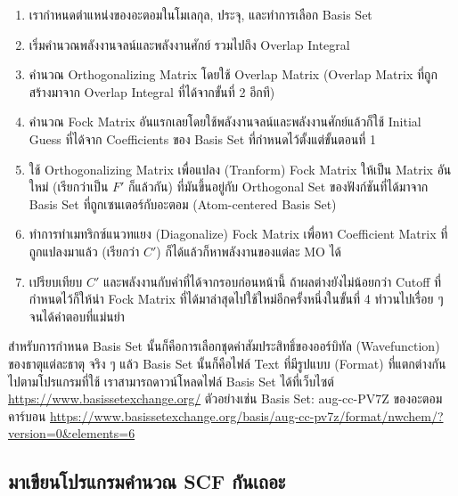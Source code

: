 \begin{enumerate}[topsep=0pt,noitemsep]
  \setlength\itemsep{1em}
  \item เรากำหนดตำแหน่งของอะตอมในโมเลกุล, ประจุ, และทำการเลือก Basis Set

  \item เริ่มคำนวณพลังงานจลน์และพลังงานศักย์ รวมไปถึง Overlap Integral

  \item คำนวณ Orthogonalizing Matrix โดยใช้ Overlap Matrix (Overlap Matrix ที่ถูกสร้างมาจาก Overlap Integral
        ที่ได้จากขั้นที่ 2 อีกที)

  \item คำนวณ Fock Matrix อันแรกเลยโดยใช้พลังงานจลน์และพลังงานศักย์แล้วก็ใช้ Initial Guess ที่ได้จาก Coefficients
        ของ Basis Set ที่กำหนดไว้ตั้งแต่ขั้นตอนที่ 1

  \item ใช้ Orthogonalizing Matrix เพื่อแปลง (Tranform) Fock Matrix ให้เป็น Matrix อันใหม่ (เรียกว่าเป็น $F'$ ก็แล้วกัน)
        ที่มันขึ้นอยู่กับ Orthogonal Set ของฟังก์ชันที่ได้มาจาก Basis Set ที่ถูกเซนเตอร์กับอะตอม (Atom-centered Basis Set)

  \item ทำการทำเมทริกซ์แนวทแยง (Diagonalize) Fock Matrix เพื่อหา Coefficient Matrix ที่ถูกแปลงมาแล้ว (เรียกว่า $C'$)
        ก็ได้แล้วก็หาพลังงานของแต่ละ MO ได้

  \item เปรียบเทียบ $C'$ และพลังงานกับค่าที่ได้จากรอบก่อนหน้านี้ ถ้าผลต่างยังไม่น้อยกว่า Cutoff ที่กำหนดไว้ก็ให้นำ Fock Matrix
        ที่ได้มาล่าสุดไปใช้ใหม่อีกครั้งหนึ่งในขั้นที่ 4 ทำวนไปเรื่อย ๆ จนได้คำตอบที่แม่นยำ
\end{enumerate}

สำหรับการกำหนด Basis Set นั้นก็คือการเลือกชุดค่าสัมประสิทธิ์ของออร์บิทัล (Wavefunction) ของธาตุแต่ละธาตุ จริง ๆ แล้ว Basis Set
นั้นก็คือไฟล์ Text ที่มีรูปแบบ (Format) ที่แตกต่างกันไปตามโปรแกรมที่ใช้ เราสามารถดาวน์โหลดไฟล์ Basis Set ได้ที่เว็บไซต์
\url{https://www.basissetexchange.org/} ตัวอย่างเช่น Basis Set: aug-cc-PV7Z ของอะตอมคาร์บอน
\url{https://www.basissetexchange.org/basis/aug-cc-pv7z/format/nwchem/?version=0&elements=6}

\subsection{มาเขียนโปรแกรมคำนวณ SCF กันเถอะ}

